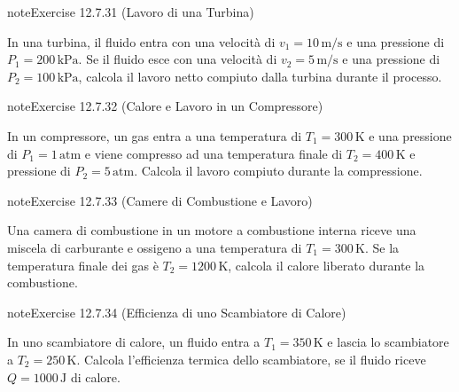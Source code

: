 \documentclass[letterpaper,10pt,italian]{jupyterBook}
\begin{document}
\begin{sphinxadmonition}{note}{Exercise 12.7.31 (Lavoro di una Turbina)}



\sphinxAtStartPar
In una turbina, il fluido entra con una velocità di \(v_1 = 10 \, \text{m/s}\) e una pressione di \(P_1 = 200 \, \text{kPa}\). Se il fluido esce con una velocità di \(v_2 = 5 \, \text{m/s}\) e una pressione di \(P_2 = 100 \, \text{kPa}\), calcola il lavoro netto compiuto dalla turbina durante il processo.
\end{sphinxadmonition}
 \label{exercise:ch/thermodynamics/principles-problems-exercise-31}

\begin{sphinxadmonition}{note}{Exercise 12.7.32 (Calore e Lavoro in un Compressore)}



\sphinxAtStartPar
In un compressore, un gas entra a una temperatura di \(T_1 = 300 \, \text{K}\) e una pressione di \(P_1 = 1 \, \text{atm}\) e viene compresso ad una temperatura finale di \(T_2 = 400 \, \text{K}\) e pressione di \(P_2 = 5 \, \text{atm}\). Calcola il lavoro compiuto durante la compressione.
\end{sphinxadmonition}
 \label{exercise:ch/thermodynamics/principles-problems-exercise-32}

\begin{sphinxadmonition}{note}{Exercise 12.7.33 (Camere di Combustione e Lavoro)}



\sphinxAtStartPar
Una camera di combustione in un motore a combustione interna riceve una miscela di carburante e ossigeno a una temperatura di \(T_1 = 300 \, \text{K}\). Se la temperatura finale dei gas è \(T_2 = 1200 \, \text{K}\), calcola il calore liberato durante la combustione.
\end{sphinxadmonition}
 \label{exercise:ch/thermodynamics/principles-problems-exercise-33}

\begin{sphinxadmonition}{note}{Exercise 12.7.34 (Efficienza di uno Scambiatore di Calore)}



\sphinxAtStartPar
In uno scambiatore di calore, un fluido entra a \(T_1 = 350 \, \text{K}\) e lascia lo scambiatore a \(T_2 = 250 \, \text{K}\). Calcola l’efficienza termica dello scambiatore, se il fluido riceve \(Q = 1000 \, \text{J}\) di calore.
\end{sphinxadmonition}
 \label{exercise:ch/thermodynamics/principles-problems-exercise-34}
\end{document}

